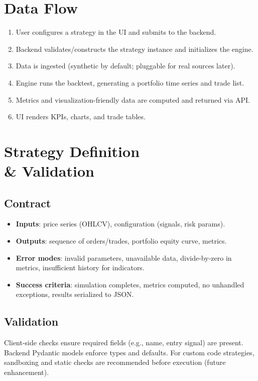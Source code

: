 \documentclass[11pt,a4paper]{article}
\begin{document}
\section{Data Flow}
\begin{enumerate}[leftmargin=*]
  \item User configures a strategy in the UI and submits to the backend.
  \item Backend validates/constructs the strategy instance and initializes the engine.
  \item Data is ingested (synthetic by default; pluggable for real sources later).
  \item Engine runs the backtest, generating a portfolio time series and trade list.
  \item Metrics and visualization-friendly data are computed and returned via API.
  \item UI renders KPIs, charts, and trade tables.
\end{enumerate}

\section{Strategy Definition \\ \& Validation}
\subsection{Contract}
\begin{itemize}[leftmargin=*]
  \item \textbf{Inputs}: price series (OHLCV), configuration (signals, risk params).
  \item \textbf{Outputs}: sequence of orders/trades, portfolio equity curve, metrics.
  \item \textbf{Error modes}: invalid parameters, unavailable data, divide-by-zero in metrics, insufficient history for indicators.
  \item \textbf{Success criteria}: simulation completes, metrics computed, no unhandled exceptions, results serialized to JSON.
\end{itemize}

\subsection{Validation}
Client-side checks ensure required fields (e.g., name, entry signal) are present. Backend Pydantic models enforce types and defaults. For custom code strategies, sandboxing and static checks are recommended before execution (future enhancement).
\end{document}
